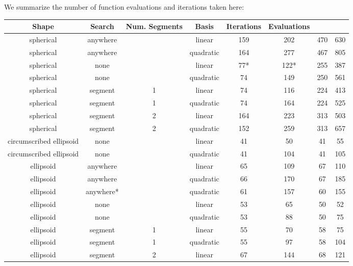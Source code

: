 We summarize the number of function evaluations and iterations taken here:
\begin{center}
\begin{tabular}{ c c c c c c c c }
Shape & Search & Num. Segments & Basis & Iterations & Evaluations \\
\hline
                spherical &   anywhere &       &     linear & 159  &   202  &  470 &  630 \\
                spherical &   anywhere &       &  quadratic & 164  &   277  &  467 &  805 \\
                spherical &       none &       &     linear &  77* &   122* &  255 &  387 \\
                spherical &       none &       &  quadratic &  74  &   149  &  250 &  561 \\
                spherical &    segment &     1 &     linear &  74  &   116  &  224 &  413 \\
                spherical &    segment &     1 &  quadratic &  74  &   164  &  224 &  525 \\
                spherical &    segment &     2 &     linear & 164  &   223  &  313 &  503 \\
                spherical &    segment &     2 &  quadratic & 152  &   259  &  313 &  657 \\
  circumscribed ellipsoid &       none &       &     linear &  41  &    50  &   41 &   55 \\
  circumscribed ellipsoid &       none &       &  quadratic &  41  &   104  &   41 &  105 \\
                ellipsoid &   anywhere &       &     linear &  65  &   109  &   67 &  110 \\
                ellipsoid &   anywhere &       &  quadratic &  66  &   170  &   67 &  185 \\
                ellipsoid &  anywhere* &       &  quadratic &  61  &   157  &   60 &  155 \\
                ellipsoid &       none &       &     linear &  53  &    65  &   50 &   52 \\
                ellipsoid &       none &       &  quadratic &  53  &    88  &   50 &   75 \\
                ellipsoid &    segment &     1 &     linear &  55  &    70  &   58 &   75 \\
                ellipsoid &    segment &     1 &  quadratic &  55  &    97  &   58 &  104 \\
                ellipsoid &    segment &     2 &     linear &  67  &   144  &   68 &  121 \\

\end{tabular}
\end{center}

